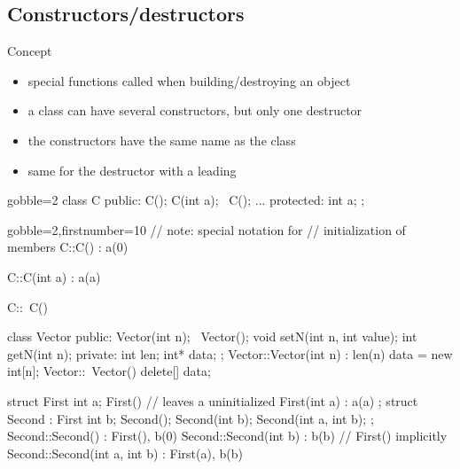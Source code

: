 \subsection[construct]{Constructors/destructors}

\begin{frame}[fragile]
  \begin{block}{Concept}
    \begin{itemize}
    \item special functions called when building/destroying an object
    \item a class can have several constructors, but only one destructor
    \item the constructors have the same name as the class
    \item same for the destructor with a leading \cppinline{~}
    \end{itemize}
  \end{block}
  \begin{multicols}{2}
    \begin{cppcode*}{gobble=2}
      class C {
      public:
        C();
        C(int a);
        ~C();
        ...
      protected:
        int a;
      };
    \end{cppcode*}
    \columnbreak
    \begin{cppcode*}{gobble=2,firstnumber=10}
      // note: special notation for
      // initialization of members
      C::C() : a(0) {}

      C::C(int a) : a(a) {}

      C::~C() {}
    \end{cppcode*}
  \end{multicols}
\end{frame}


\begin{frame}[fragile]
  \begin{cppcode}
    class Vector {
    public:
      Vector(int n);
      ~Vector();
      void setN(int n, int value);
      int getN(int n);
    private:
      int len;
      int* data;
    };
    Vector::Vector(int n) : len(n) {
      data = new int[n];
    }
    Vector::~Vector() {
      delete[] data;
    }
  \end{cppcode}
\end{frame}

\begin{frame}[fragile]
  \begin{cppcode}
    struct First {
      int a;
      First() {} // leaves a uninitialized
      First(int a) : a(a) {}
    };
    struct Second : First {
      int b;
      Second();
      Second(int b);
      Second(int a, int b);
    };
    Second::Second() : First(), b(0) {}
    Second::Second(int b) : b(b) {} // First() implicitly
    Second::Second(int a, int b) : First(a), b(b) {}
  \end{cppcode}
\end{frame}

